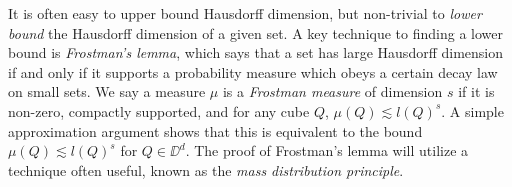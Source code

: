 
It is often easy to upper bound Hausdorff dimension, but non-trivial to \emph{lower bound} the Hausdorff dimension of a given set. A key technique to finding a lower bound is \emph{Frostman's lemma}, which says that a set has large Hausdorff dimension if and only if it supports a probability measure which obeys a certain decay law on small sets. We say a measure $\mu$ is a \emph{Frostman measure} of dimension $s$ if it is non-zero, compactly supported, and for any cube $Q$, $\mu(Q) \lesssim l(Q)^s$. A simple approximation argument shows that this is equivalent to the bound $\mu(Q) \lesssim l(Q)^s$ for $Q \in \DD^d$. The proof of Frostman's lemma will utilize a technique often useful, known as the \emph{mass distribution principle}.

